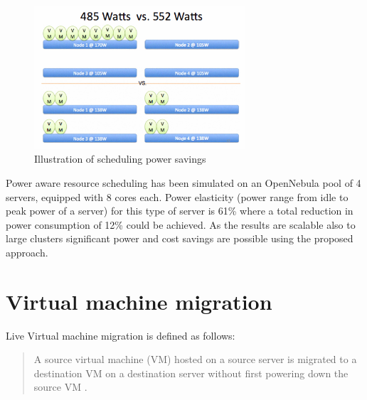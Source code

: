 \begin{figure}[htbp]
	\centering
		\includegraphics[width=0.7\textwidth]{figures/state_of_the_art/server_power_consumption.PNG}
	\caption{Illustration of scheduling power savings \cite{younge2010efficient}}
	\label{fig:server_power_consumption}
\end{figure}

Power aware resource scheduling has been simulated on an OpenNebula \cite{fontan2008opennebula} pool of 4 servers, equipped with 8 cores each. Power elasticity (power range from idle to peak power of a server) for this type of server is 61\% where a total reduction in power consumption of 12\% could be achieved. As the results are scalable also to large clusters significant power and cost savings are possible using the proposed approach. 



\section{Virtual machine migration}


Live Virtual machine migration is defined as follows:
\begin{quote}
A source virtual machine (VM) hosted on a source server is
migrated to a destination VM on a destination server without
first powering down the source VM \cite{nelson2009virtual}.
\end{quote}

